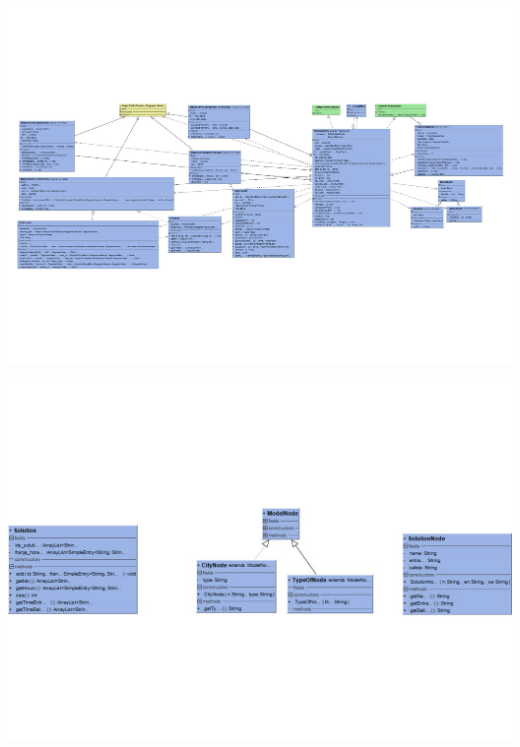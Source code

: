 \thispagestyle{empty}
{%
	\label{fig:main_activity_diagram}
	\centering
	\includegraphics[scale=.95,angle=90]{imagenes/main_activity_class_diagram.pdf}
	\par
}
\restoregeometry

\thispagestyle{empty}
{%
	\label{fig:models_diagram}
	\centering
	\includegraphics[scale=.95,angle=90]{imagenes/models_package.pdf}
	\par
}
\restoregeometry

